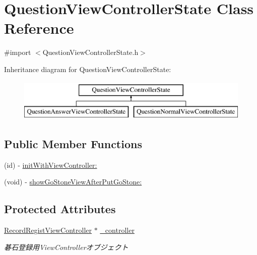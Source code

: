 \hypertarget{interface_question_view_controller_state}{
\section{QuestionViewControllerState Class Reference}
\label{interface_question_view_controller_state}
}


{\ttfamily \#import $<$QuestionViewControllerState.h$>$}

Inheritance diagram for QuestionViewControllerState:\begin{figure}[H]
\begin{center}
\leavevmode
\includegraphics[height=2.000000cm]{interface_question_view_controller_state}
\end{center}
\end{figure}
\subsection*{Public Member Functions}
\begin{DoxyCompactItemize}
\item 
(id) -\/ \hyperlink{interface_question_view_controller_state_ad6671b0003640052f8a209f220724e36}{initWithViewController:}
\item 
(void) -\/ \hyperlink{interface_question_view_controller_state_aacfaedec03e95da2d045cef993066ef3}{showGoStoneViewAfterPutGoStone:}
\end{DoxyCompactItemize}
\subsection*{Protected Attributes}
\begin{DoxyCompactItemize}
\item 
\hypertarget{interface_question_view_controller_state_af18bb29cdb60084cbf28612b92153799}{
\hyperlink{interface_record_regist_view_controller}{RecordRegistViewController} $\ast$ \hyperlink{interface_question_view_controller_state_af18bb29cdb60084cbf28612b92153799}{\_\-controller}}
\label{interface_question_view_controller_state_af18bb29cdb60084cbf28612b92153799}

\begin{DoxyCompactList}\small\item\em 碁石登録用ViewControllerオブジェクト \end{DoxyCompactList}\end{DoxyCompactItemize}


